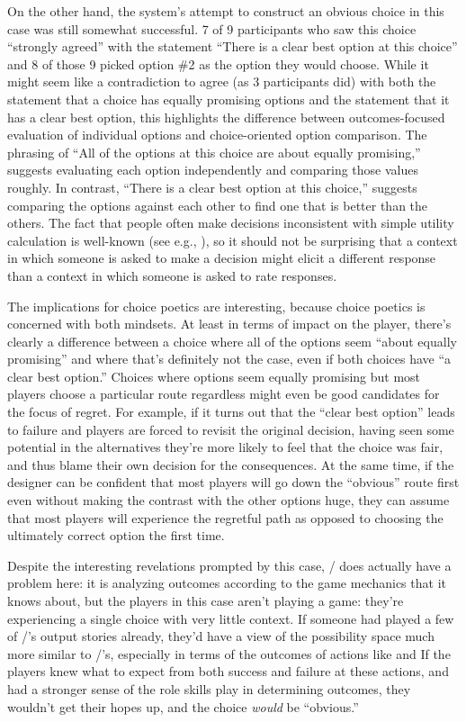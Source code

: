 On the other hand, the system's attempt to construct an obvious choice in this case was still somewhat successful.
%
7 of 9 participants who saw this choice ``strongly agreed'' with the statement ``There is a clear best option at this choice'' and 8 of those 9 picked option \#2 as the option they would choose.
%
While it might seem like a contradiction to agree (as 3 participants did) with both the statement that a choice has equally promising options and the statement that it has a clear best option, this highlights the difference between outcomes-focused evaluation of individual options and choice-oriented option comparison.
%
The phrasing of ``All of the options at this choice are about equally promising,'' suggests evaluating each option independently and comparing those values roughly.
%
In contrast, ``There is a clear best option at this choice,'' suggests comparing the options against each other to find one that is better than the others.
%
The fact that people often make decisions inconsistent with simple utility calculation is well-known (see e.g., \citep{Tversky1993}), so it should not be surprising that a context in which someone is asked to make a decision might elicit a different response than a context in which someone is asked to rate responses.


The implications for choice poetics are interesting, because choice poetics is concerned with both mindsets.
%
At least in terms of impact on the player, there's clearly a difference between a choice where all of the options seem ``about equally promising'' and where that's definitely not the case, even if both choices have ``a clear best option.''
%
Choices where options seem equally promising but most players choose a particular route regardless might even be good candidates for the focus of regret.
%
For example, if it turns out that the ``clear best option'' leads to failure and players are forced to revisit the original decision, having seen some potential in the alternatives they're more likely to feel that the choice was fair, and thus blame their own decision for the consequences.
%
At the same time, if the designer can be confident that most players will go down the ``obvious'' route first even without making the contrast with the other options huge, they can assume that most players will experience the regretful path as opposed to choosing the ultimately correct option the first time.


Despite the interesting revelations prompted by this case, \dunyazad/ does actually have a problem here: it is analyzing outcomes according to the game mechanics that it knows about, but the players in this case aren't playing a game: they're experiencing a single choice with very little context.
%
If someone had played a few of \dunyazad/'s output stories already, they'd have a view of the possibility space much more similar to \dunyazad/'s, especially in terms of the outcomes of actions like  and 
%
If the players knew what to expect from both success and failure at these actions, and had a stronger sense of the role skills play in determining outcomes, they wouldn't get their hopes up, and the choice \emph{would} be ``obvious.''



